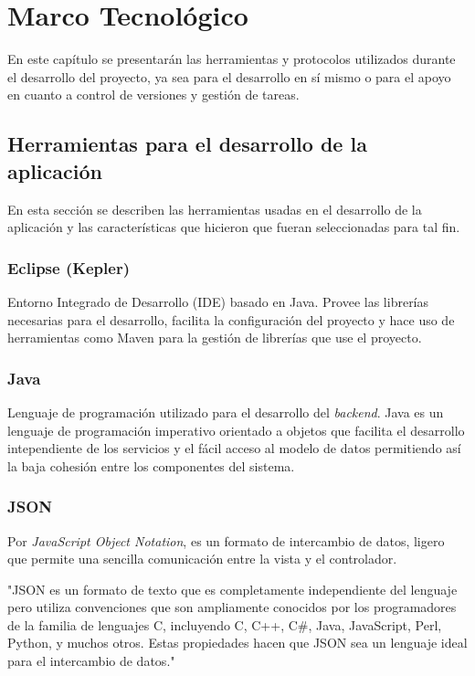 \chapter{Marco Tecnológico}

En este capítulo se presentarán las herramientas y protocolos utilizados durante el desarrollo del proyecto, ya sea para el desarrollo en sí mismo o para el apoyo en cuanto a control de versiones y gestión de tareas.

    \section{Herramientas para el desarrollo de la aplicación}
    
    En esta sección se describen las herramientas usadas en el desarrollo de la aplicación y las características que hicieron que fueran seleccionadas para tal fin.
    
        \subsection{Eclipse (Kepler)}
        
        Entorno Integrado de Desarrollo (IDE) basado en Java. Provee las librerías necesarias para el desarrollo, facilita la configuración del proyecto y hace uso de herramientas como Maven para la gestión de librerías que use el proyecto.
    
        \subsection{Java}
        
        Lenguaje de programación utilizado para el desarrollo del \textit{backend}. Java es un lenguaje de programación imperativo orientado a objetos que facilita el desarrollo intependiente de los servicios y el fácil acceso al modelo de datos permitiendo así la baja cohesión entre los componentes del sistema.
        
        \subsection{JSON}
        
        Por \textit{JavaScript Object Notation}, es un formato de intercambio de datos, ligero\cite{JSON-yahoo} que permite una sencilla comunicación entre la vista y el controlador.
        
        "JSON es un formato de texto que es completamente independiente del lenguaje pero utiliza convenciones que son ampliamente conocidos por los programadores de la familia de lenguajes C, incluyendo C, C++, C\#, Java, JavaScript, Perl, Python, y muchos otros. Estas propiedades hacen que JSON sea un lenguaje ideal para el intercambio de datos\cite{JSON-jsonOrg}."
        
